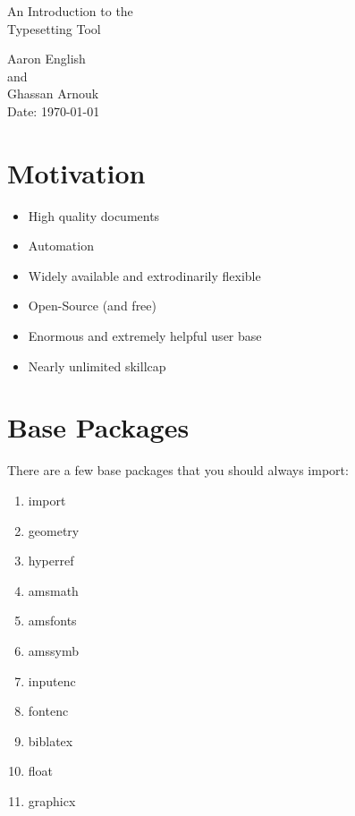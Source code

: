 \documentclass[hidelinks, 12pt]{article}%
\begin{document}
    \begin{center}
        \vspace*{1cm}
        {\fontsize{300}{50}\selectfont {\bfseries Hello \LaTeX\\}}
        \vspace{3cm}
        {\LARGE An Introduction to the\\
        Typesetting Tool\\}
        \vspace{10cm}
    \end{center}
    \begin{raggedleft}
        {\Large Aaron English\\
            and\\
            Ghassan Arnouk\\
            Date: \today\\}
    \end{raggedleft}
    \thispagestyle{empty}

    \clearpage
    \tableofcontents
    \clearpage
    \section{Motivation}
        \begin{itemize}
            \item High quality documents
            \item Automation
            \item Widely available and extrodinarily flexible
            \item Open-Source (and free)
            \item Enormous and extremely helpful user base
            \item Nearly unlimited skillcap
        \end{itemize}


    \section{Base Packages}
        There are a few base packages that you should always import:
        \begin{enumerate}
            \item import
            \item geometry
            \item hyperref
            \item amsmath
            \item amsfonts
            \item amssymb
            \item inputenc
            \item fontenc
            \item biblatex
            \item float
            \item graphicx
        \end{enumerate}
        
\end{document}
